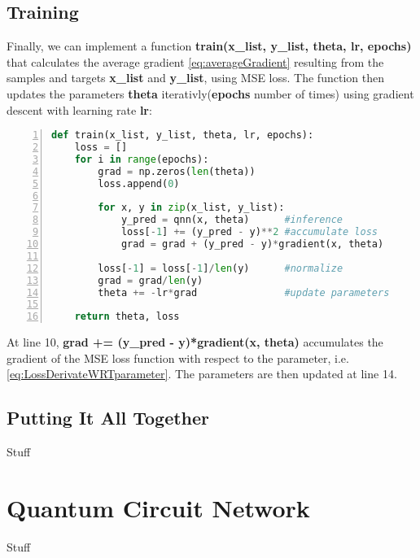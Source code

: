 \subsection{Training}\label{sec:QNNTraining}

Finally, we can implement a function \textbf{train(x\_list, y\_list, theta, lr, epochs)} that calculates the average gradient \autoref{eq:averageGradient} resulting from the samples and targets \textbf{x\_list} and \textbf{y\_list}, using MSE loss. The function then updates the parameters \textbf{theta} iterativly(\textbf{epochs} number of times) using gradient descent with learning rate \textbf{lr}:

\begin{lstlisting}[language=python, numbers=left]
def train(x_list, y_list, theta, lr, epochs):
    loss = []
    for i in range(epochs):
        grad = np.zeros(len(theta))
        loss.append(0)
        
        for x, y in zip(x_list, y_list):
            y_pred = qnn(x, theta)      #inference
            loss[-1] += (y_pred - y)**2 #accumulate loss        
            grad = grad + (y_pred - y)*gradient(x, theta)
        
        loss[-1] = loss[-1]/len(y)      #normalize
        grad = grad/len(y)
        theta += -lr*grad               #update parameters
    
    return theta, loss
\end{lstlisting}

At line 10, \textbf{grad += (y\_pred - y)*gradient(x, theta)} accumulates the gradient of the MSE loss function with respect to the parameter, i.e. \autoref{eq:LossDerivateWRTparameter}. The parameters are then updated at line 14.


\subsection{Putting It All Together}\label{sec:PIAT}
Stuff

\section{Quantum Circuit Network}\label{sec:QCNimplementation}
Stuff

